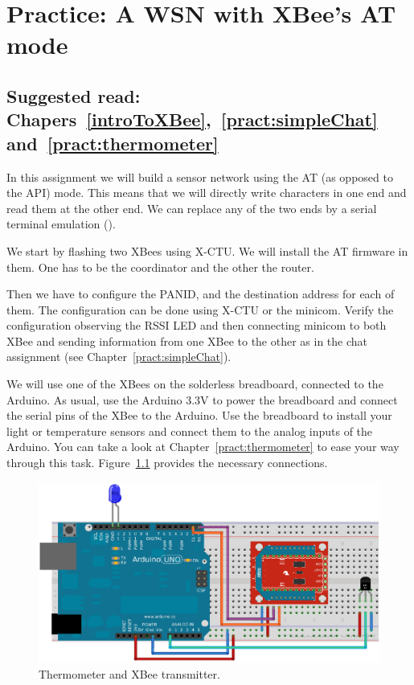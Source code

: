 \chapter{Practice: A WSN with XBee's AT mode}\label{ATSensorNetwork}
\section*{Suggested read: Chapers~\ref{introToXBee},~\ref{pract:simpleChat} and~\ref{pract:thermometer}}

In this assignment we will build a sensor network using the AT (as opposed to the API) mode.
This means that we will directly write characters in one end and read them at the other end.
We can replace any of the two ends by a serial terminal emulation (\emph{}).

We start by flashing two XBees using X-CTU.
We will install the AT firmware in them.
One has to be the coordinator and the other the router.

Then we have to configure the PANID, and the destination address for each of them.
The configuration can be done using X-CTU or the minicom.
Verify the configuration observing the RSSI LED and then connecting minicom to both XBee and sending information from one XBee to the other as in the chat assignment (see Chapter~\ref{pract:simpleChat}).

We will use one of the XBees on the solderless breadboard, connected to the Arduino.
As usual, use the Arduino 3.3V to power the breadboard and connect the serial pins of the XBee to the Arduino.
Use the breadboard to install your light or temperature sensors and connect them to the analog inputs of the Arduino. You can take a look at Chapter~\ref{pract:thermometer} to ease your way through this task. Figure~\ref{fig:thermometerInArduino} provides the necessary connections.

\begin{figure}[htbp]
  \centering
  \includegraphics[width=0.85\linewidth]{figures/thermometerInArduino.eps}
  \caption{Thermometer and XBee transmitter.}
  \label{fig:thermometerInArduino}
\end{figure}

